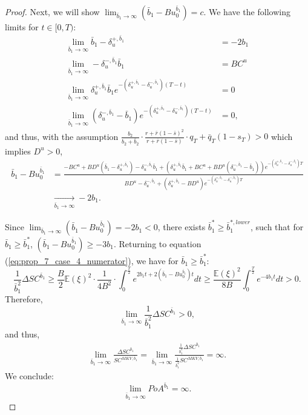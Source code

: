 \documentclass[11pt]{article}
\begin{document}
\begin{proof}
	Next, we will show $\lim_{\bar{b}_1 \to \infty}(\bar{b}_1-B u_0^{\bar{b}_1})=c$. We have the following limits for $t\in[0,T)$:
	\begin{equation*}
	\begin{split}
	\lim_{\bar{b}_1 \to \infty}\bar{b}_1-\delta^{+,\bar{b}_1}_u&=-2b_1\\
	\lim_{\bar{b}_1 \to \infty}-\delta^{-,\bar{b}_1}_u\bar{b}_1&=BC^u\\
	\lim_{\bar{b}_1 \to \infty}\delta^{+,\bar{b}_1}_u\bar{b}_1e^{-(\delta^{+,\bar{b}_1}_u-\delta^{-,\bar{b}_1}_u)(T-t)}&=0\\
	\lim_{\bar{b}_1 \to \infty}(\delta^{-,\bar{b}_1}_u-\bar{b}_1)e^{-(\delta^{+,\bar{b}_1}_u-\delta^{-,\bar{b}_1}_u)(T-t)}&=0,
	\end{split}
	\end{equation*}
	and thus, with the assumption $\frac{b_2}{b_2+\bar{b}_2}\cdot \frac{r + \bar{r}(1- \bar{s})^2}{r + \bar{r}(1-\bar{s})}\cdot q_T+\bar{q}_T(1-s_T) >0$ which implies $D^u>0$,
	\begin{equation*}
	\begin{split}
	\bar{b}_1-Bu^{\bar{b}_1}_0&=\frac{-BC^u+BD^u(\bar{b}_1-\delta^{+,\bar{b}_1}_u)-\delta^{-,\bar{b}_1}_u\bar{b}_1+(\delta^{+,\bar{b}_1}_u\bar{b}_1+BC^u+BD^u(\delta^{-,\bar{b}_1}_u-\bar{b}_1))e^{-(\delta^{+,\bar{b}_1}_u-\delta^{-,\bar{b}_1}_u)T}}{BD^u-\delta^{-,\bar{b}_1}_u+(\delta^{+,\bar{b}_1}_u-BD^u) e^{-(\delta^{+,\bar{b}_1}_u-\delta^{-,\bar{b}_1}_u)T}} \\
	&\xrightarrow[\bar{b}_1 \to \infty]{} -2b_1 .
	\end{split}
	\end{equation*}
	
	Since $\lim_{\bar{b}_1 \to \infty}(\bar{b}_1-B u_0^{\bar{b}_1}) = -2b_1 < 0$, there exists $\bar{b}_1^{*}\geq\bar{b}_1^{*,lower}$, such that for $\bar{b}_1 \geq \bar{b}_1^{*}$, $(\bar{b}_1-B u_0^{\bar{b}_1}) \geq -3b_1$. Returning to equation (\ref{eq:prop_7_case_4_numerator}), we have for $\bar{b}_1 \geq \bar{b}^*_1$:
	\begin{equation}
	\frac{1}{\bar{b}_1^2}\Delta SC^{\bar{b}_1}
	\geq \frac{B}{2}\mathbb{E}(\xi)^2 \cdot \frac{1}{4B^2} \cdot \int_{0}^{\frac{T}{2}} e^{2b_1 t + 2(\bar{b}_1 - B u_0^{\bar{b}_1}) t } dt \geq \frac{\mathbb{E}(\xi)^2}{8 B} \int_0^{\frac{T}{2}} e^{-4b_1 t} dt  > 0.
	\end{equation}
	Therefore,
	\begin{equation*}
	\lim_{\bar{b}_1 \to \infty}\frac{1}{\bar{b}_1^2}\Delta SC^{\bar{b}_1}>0,
	\end{equation*}
	and thus,
	\begin{equation*}
	\begin{split}
	\lim_{\bar{b}_1 \to \infty}\frac{\Delta SC^{\bar{b}_1}}{SC^{MKV,\bar{b}_1}}=\lim_{\bar{b}_1 \to \infty}\frac{\frac{1}{\bar{b}_1^2}\Delta SC^{\bar{b}_1}}{\frac{1}{\bar{b}_1^2}SC^{MKV,\bar{b}_1}}=\infty.
	\end{split}
	\end{equation*}
	We conclude:
	\begin{equation*}
	\lim_{\bar{b}_1 \to \infty} PoA^{\bar{b}_1}=\infty.
	\end{equation*}
	

\end{proof}
\end{document}
